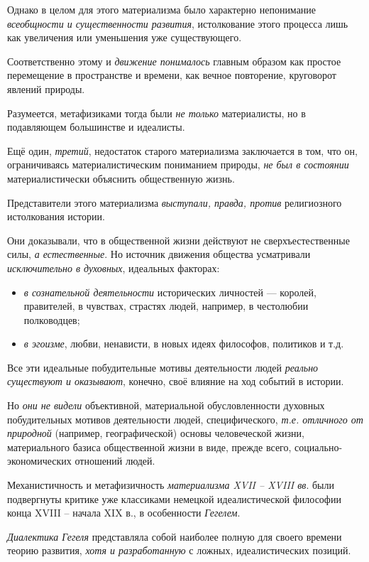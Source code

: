 \documentclass[a4paper,14pt,russian]{extreport}
\begin{document}
Однако в целом для этого материализма было характерно непонимание \emph{всеобщности и существенности развития}, истолкование этого процесса лишь как увеличения или уменьшения уже существующего.

Соответственно этому и \emph{движение понималось} главным образом как простое перемещение в пространстве и времени, как вечное повторение, круговорот явлений природы.

Разумеется, метафизиками тогда были \emph{не только} материалисты, но в подавляющем большинстве и идеалисты.

Ещё один, \emph{третий}, недостаток старого материализма заключается в том, что он, ограничиваясь материалистическим пониманием природы, \emph{не был в состоянии} материалистически объяснить общественную жизнь.

Представители этого материализма \emph{выступали, правда, против} религиозного истолкования истории.

Они доказывали, что в общественной жизни действуют не сверхъестественные силы, \emph{а естественные}. Но источник движения общества усматривали \emph{исключительно в духовных}, идеальных факторах:

\begin{itemize}
\item \emph{в сознательной деятельности} исторических личностей --- королей, правителей, в чувствах, страстях людей, например, в честолюбии полководцев;
\item \emph{в эгоизме}, любви, ненависти, в новых идеях философов, политиков и т.д.
\end{itemize}

Все эти идеальные побудительные мотивы деятельности людей \emph{реально существуют и оказывают}, конечно, своё влияние на ход событий в истории.

Но \emph{они не видели} объективной, материальной обусловленности духовных побудительных мотивов деятельности людей, специфического, \emph{т.е. отличного от природной} (например, географической) основы человеческой жизни, материального базиса общественной жизни в виде, прежде всего, социально-экономических отношений людей.

Механистичность и метафизичность \emph{материализма XVII -- XVIII вв}. были подвергнуты критике уже классиками немецкой идеалистической философии конца XVIII -- начала XIX в., в особенности \emph{Гегелем}.

\emph{Диалектика Гегеля} представляла собой наиболее полную для своего времени теорию развития, \emph{хотя и разработанную} с ложных, идеалистических позиций.
\end{document}
